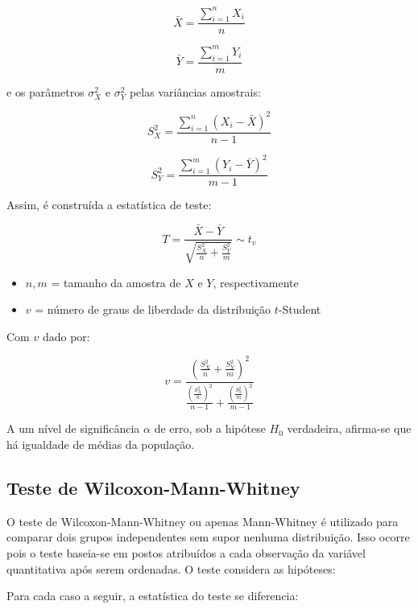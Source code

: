 \documentclass[
]{estat/estat}
\providecommand{\tightlist}{%
  \setlength{\itemsep}{0pt}\setlength{\parskip}{0pt}}\usepackage{longtable,booktabs,array}
\begin{document}
\[
\bar{X} = \frac{\sum_{i=1}^{n} X_i}{n}
\]

\[
\bar{Y} = \frac{\sum_{i=1}^{m} Y_i}{m}
\]

e os parâmetros \(\sigma_X^2\) e \(\sigma_Y^2\) pelas variâncias
amostrais:

\[
S_X^2 = \frac{\sum_{i=1}^{n}(X_i - \bar{X})^2}{n - 1}
\]

\[
S_Y^2 = \frac{\sum_{i=1}^{m}(Y_i - \bar{Y})^2}{m - 1}
\]

Assim, é construída a estatística de teste:

\[
T = \frac{\bar{X} - \bar{Y}}{\sqrt{\frac{S_X^2}{n} + \frac{S_Y^2}{m}}} \sim t_v
\]

\begin{itemize}
\tightlist
\item
  \(n, m\) = tamanho da amostra de \(X\) e \(Y\), respectivamente
\item
  \(v\) = número de graus de liberdade da distribuição \(t\)-Student
\end{itemize}

Com \(v\) dado por:

\[
v = \frac{\left(\frac{S_X^2}{n} + \frac{S_Y^2}{m}\right)^2}{\frac{\left(\frac{S_X^2}{n}\right)^2}{n - 1} + \frac{\left(\frac{S_Y^2}{m}\right)^2}{m - 1}}
\]

A um nível de significância \(\alpha\) de erro, sob a hipótese \(H_{0}\)
verdadeira, afirma-se que há igualdade de médias da população.

\hypertarget{teste-de-wilcoxon-mann-whitney}{%
\subsection{Teste de
Wilcoxon-Mann-Whitney}\label{teste-de-wilcoxon-mann-whitney}}

O teste de Wilcoxon-Mann-Whitney ou apenas Mann-Whitney é utilizado para
comparar dois grupos independentes sem supor nenhuma distribuição. Isso
ocorre pois o teste baseia-se em postos atribuídos a cada observação da
variável quantitativa após serem ordenadas. O teste considera as
hipóteses:


Para cada caso a seguir, a estatística do teste se diferencia:
\end{document}

